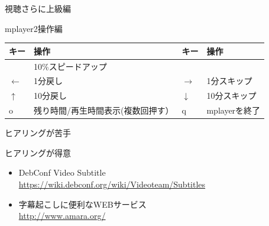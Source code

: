 \begin{frame}{視聴さらに上級編}


\end{frame}

\begin{frame}{mplayer2操作編}

\begin{table}[ht]
\begin{center}
\begin{tabular}{|l|p{4cm}|l|p{4cm}|}
\hline 
キー&操作 &キー & 操作\\ \hline \hline
[ & 10\%スロー & ] & 10\%スピードアップ \\ \hline 
$\leftarrow$ & 1分戻し & $\rightarrow$ & 1分スキップ \\ \hline
$\uparrow$ & 10分戻し & $\downarrow$ & 10分スキップ \\ \hline
o & 残り時間/再生時間表示(複数回押す） & q & mplayerを終了\\ \hline
\end{tabular}
\end{center}
\end{table}


\end{frame}

\begin{frame}[containsverbatim]{ヒアリングが苦手}




\end{frame}

\begin{frame}{ヒアリングが得意}

\begin{itemize}
　\item DebConf Video Subtitle \\ \url{https://wiki.debconf.org/wiki/Videoteam/Subtitles}
　\item 字幕起こしに便利なWEBサービス\\ \url{http://www.amara.org/}
\end{itemize}

\end{frame}

